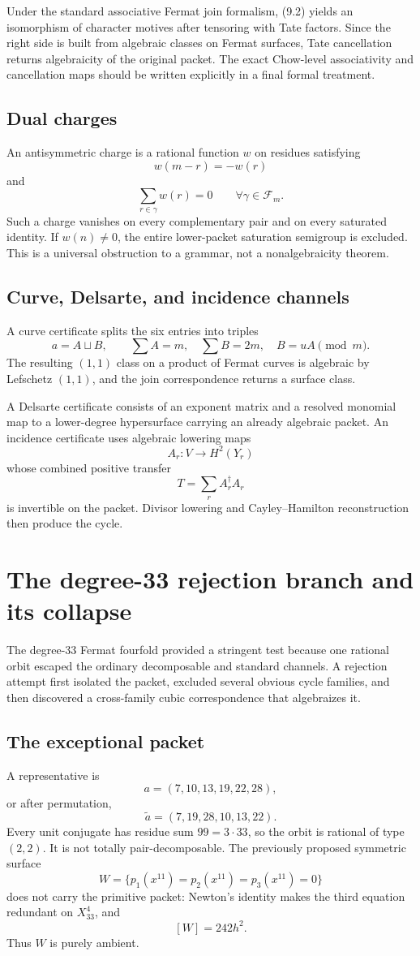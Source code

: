 \documentclass[11pt,oneside]{book}
\theoremstyle{definition}
\theoremstyle{remark}
\begin{document}
Under the standard associative Fermat join formalism, (9.2) yields an isomorphism of character motives after tensoring with Tate factors. Since the right side is built from algebraic classes on Fermat surfaces, Tate cancellation returns algebraicity of the original packet. The exact Chow-level associativity and cancellation maps should be written explicitly in a final formal treatment.

\section{Dual charges}
An antisymmetric charge is a rational function \(w\) on residues satisfying
\[
w(m-r)=-w(r)
\]
and
\[
\sum_{r\in\gamma}w(r)=0
\qquad\forall \gamma\in\mathcal F_m.
\]
Such a charge vanishes on every complementary pair and on every saturated identity. If \(w(n)\ne0\), the entire lower-packet saturation semigroup is excluded. This is a universal obstruction to a grammar, not a nonalgebraicity theorem.

\section{Curve, Delsarte, and incidence channels}
A curve certificate splits the six entries into triples
\[
a=A\sqcup B,
\qquad \sum A=m,
\quad \sum B=2m,
\quad B=uA\pmod m.
\]
The resulting \((1,1)\) class on a product of Fermat curves is algebraic by Lefschetz \((1,1)\), and the join correspondence returns a surface class.

A Delsarte certificate consists of an exponent matrix and a resolved monomial map to a lower-degree hypersurface carrying an already algebraic packet. An incidence certificate uses algebraic lowering maps
\[
A_r:V\to H^2(Y_r)
\]
whose combined positive transfer
\[
T=\sum_rA_r^\dagger A_r
\]
is invertible on the packet. Divisor lowering and Cayley--Hamilton reconstruction then produce the cycle.

\chapter{The degree-33 rejection branch and its collapse}
The degree-33 Fermat fourfold provided a stringent test because one rational orbit escaped the ordinary decomposable and standard channels. A rejection attempt first isolated the packet, excluded several obvious cycle families, and then discovered a cross-family cubic correspondence that algebraizes it.

\section{The exceptional packet}
A representative is
\[
a=(7,10,13,19,22,28),
\]
or after permutation,
\[
\widetilde a=(7,19,28,10,13,22).
\]
Every unit conjugate has residue sum \(99=3\cdot33\), so the orbit is rational of type \((2,2)\). It is not totally pair-decomposable. The previously proposed symmetric surface
\[
W=\{p_1(x^{11})=p_2(x^{11})=p_3(x^{11})=0\}
\]
does not carry the primitive packet: Newton's identity makes the third equation redundant on \(X_{33}^4\), and
\[
[W]=242h^2.
\]
Thus \(W\) is purely ambient.
\end{document}
